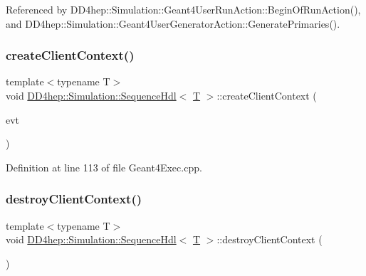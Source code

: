 Referenced by D\+D4hep\+::\+Simulation\+::\+Geant4\+User\+Run\+Action\+::\+Begin\+Of\+Run\+Action(), and D\+D4hep\+::\+Simulation\+::\+Geant4\+User\+Generator\+Action\+::\+Generate\+Primaries().

\hypertarget{class_d_d4hep_1_1_simulation_1_1_sequence_hdl_a45cfca253c17c4a89ef63d9367d4c9a4}{}\label{class_d_d4hep_1_1_simulation_1_1_sequence_hdl_a45cfca253c17c4a89ef63d9367d4c9a4} 
\subsubsection{\texorpdfstring{create\+Client\+Context()}{createClientContext()}\hspace{0.1cm}{\footnotesize\ttfamily [2/2]}}
{\footnotesize\ttfamily template$<$typename T$>$ \\
void \hyperlink{class_d_d4hep_1_1_simulation_1_1_sequence_hdl}{D\+D4hep\+::\+Simulation\+::\+Sequence\+Hdl}$<$ \hyperlink{class_t}{T} $>$\+::create\+Client\+Context (\begin{DoxyParamCaption}\item[{const G4\+Event $\ast$}]{evt }\end{DoxyParamCaption})\hspace{0.3cm}{\ttfamily [inline]}}



Definition at line 113 of file Geant4\+Exec.\+cpp.

\hypertarget{class_d_d4hep_1_1_simulation_1_1_sequence_hdl_a0f4ca2107e2527947620c788fe60bc9a}{}\label{class_d_d4hep_1_1_simulation_1_1_sequence_hdl_a0f4ca2107e2527947620c788fe60bc9a} 
\subsubsection{\texorpdfstring{destroy\+Client\+Context()}{destroyClientContext()}\hspace{0.1cm}{\footnotesize\ttfamily [1/2]}}
{\footnotesize\ttfamily template$<$typename T$>$ \\
void \hyperlink{class_d_d4hep_1_1_simulation_1_1_sequence_hdl}{D\+D4hep\+::\+Simulation\+::\+Sequence\+Hdl}$<$ \hyperlink{class_t}{T} $>$\+::destroy\+Client\+Context (\begin{DoxyParamCaption}\item[{const G4\+Run $\ast$}]{ }\end{DoxyParamCaption})\hspace{0.3cm}{\ttfamily [inline]}}



